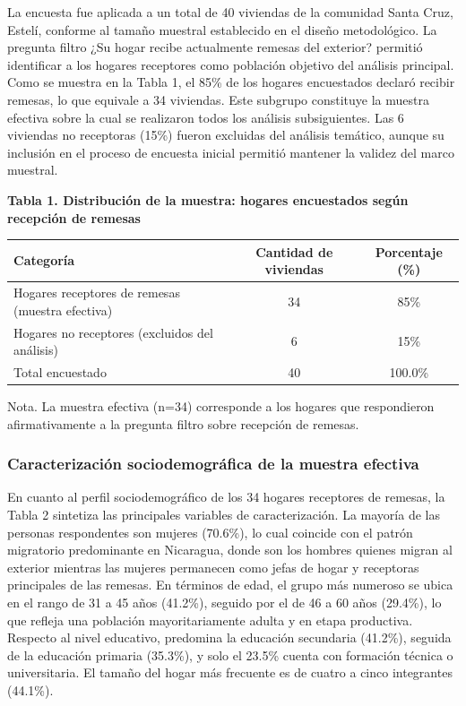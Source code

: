 \documentclass[12pt,letterpaper]{article}
\begin{document}
La encuesta fue aplicada a un total de 40 viviendas de la comunidad Santa Cruz, Estelí, conforme al tamaño muestral establecido en el diseño metodológico. La pregunta filtro ¿Su hogar recibe actualmente remesas del exterior? permitió identificar a los hogares receptores como población objetivo del análisis principal. Como se muestra en la Tabla 1, el 85\% de los hogares encuestados declaró recibir remesas, lo que equivale a 34 viviendas. Este subgrupo constituye la muestra efectiva sobre la cual se realizaron todos los análisis subsiguientes. Las 6 viviendas no receptoras (15\%) fueron excluidas del análisis temático, aunque su inclusión en el proceso de encuesta inicial permitió mantener la validez del marco muestral.

\textbf{Tabla 1. Distribución de la muestra: hogares encuestados según recepción de remesas}

\begin{longtable}[]{@{}lcc@{}}
\toprule\noalign{}
Categoría & Cantidad de viviendas & Porcentaje (\%) \\
\midrule\noalign{}
\endhead
\bottomrule\noalign{}
\endlastfoot
Hogares receptores de remesas (muestra efectiva) & 34 & 85\% \\
Hogares no receptores (excluidos del análisis) & 6 & 15\% \\
Total encuestado & 40 & 100.0\% \\
\end{longtable}

Nota. La muestra efectiva (n=34) corresponde a los hogares que respondieron afirmativamente a la pregunta filtro sobre recepción de remesas.

\subsubsection{\texorpdfstring{\textbf{Caracterización sociodemográfica de la muestra efectiva}}{Caracterización sociodemográfica de la muestra efectiva}}\label{caracterizaciuxf3n-sociodemogruxe1fica-de-la-muestra-efectiva}

En cuanto al perfil sociodemográfico de los 34 hogares receptores de remesas, la Tabla 2 sintetiza las principales variables de caracterización. La mayoría de las personas respondentes son mujeres (70.6\%), lo cual coincide con el patrón migratorio predominante en Nicaragua, donde son los hombres quienes migran al exterior mientras las mujeres permanecen como jefas de hogar y receptoras principales de las remesas. En términos de edad, el grupo más numeroso se ubica en el rango de 31 a 45 años (41.2\%), seguido por el de 46 a 60 años (29.4\%), lo que refleja una población mayoritariamente adulta y en etapa productiva. Respecto al nivel educativo, predomina la educación secundaria (41.2\%), seguida de la educación primaria (35.3\%), y solo el 23.5\% cuenta con formación técnica o universitaria. El tamaño del hogar más frecuente es de cuatro a cinco integrantes (44.1\%).
\end{document}
